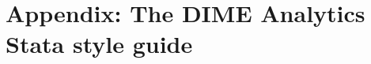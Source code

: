 
\chapter{Appendix: The DIME Analytics Stata style guide}
\label{ap:1}





\backmatter




\printindex %


